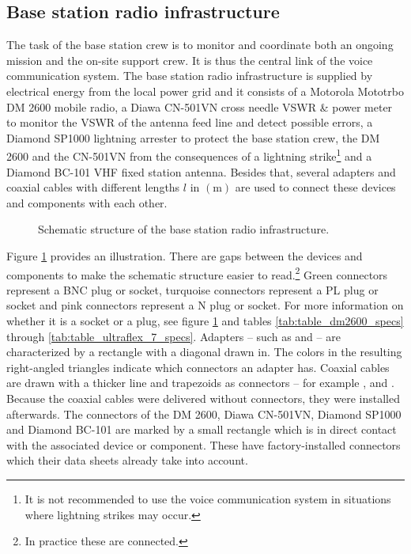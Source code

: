 \subsection{Base station radio infrastructure}
The task of the base station crew is to monitor and coordinate both an ongoing mission and the on-site support crew. It is thus the central link of the voice communication system. The base station radio infrastructure is supplied by electrical energy from the local power grid and it consists of a Motorola Mototrbo DM 2600 mobile radio, a Diawa CN-501VN cross needle VSWR \& power meter to monitor the VSWR of the antenna feed line and detect possible errors, a Diamond SP1000 lightning arrester to protect the base station crew, the DM 2600 and the CN-501VN from the consequences of a lightning strike\footnote{It is not recommended to use the voice communication system in situations where lightning strikes may occur.} and a Diamond BC-101 VHF fixed station antenna. Besides that, several adapters and coaxial cables with different lengths $l$ in $\left(\mathrm{m}\right)$ are used to connect these devices and components with each other. 
\begin{figure}[h!]
	\centering
	
	\caption{Schematic structure of the base station radio infrastructure.}
	\label{fig:tikz_base_camp_radio}
\end{figure}
Figure \ref{fig:tikz_base_camp_radio} provides an illustration. There are gaps between the devices and components to make the schematic structure easier to read.\footnote{In practice these are connected.} Green connectors represent a BNC plug or socket, turquoise connectors represent a PL plug or socket and pink connectors represent a N plug or socket. For more information on whether it is a socket or a plug, see figure \ref{fig:tikz_base_camp_radio} and tables \ref{tab:table_dm2600_specs} through \ref{tab:table_ultraflex_7_specs}. Adapters -- such as  and  -- are characterized by a rectangle with a diagonal drawn in. The colors in the resulting right-angled triangles indicate which connectors an adapter has. Coaxial cables are drawn with a thicker line and trapezoids as connectors -- for example ,  and . Because the coaxial cables were delivered without connectors, they were installed afterwards. The connectors of the DM 2600, Diawa CN-501VN, Diamond SP1000 and Diamond BC-101 are marked by a small rectangle which is in direct contact with the associated device or component. These have factory-installed connectors which their data sheets already take into account.

